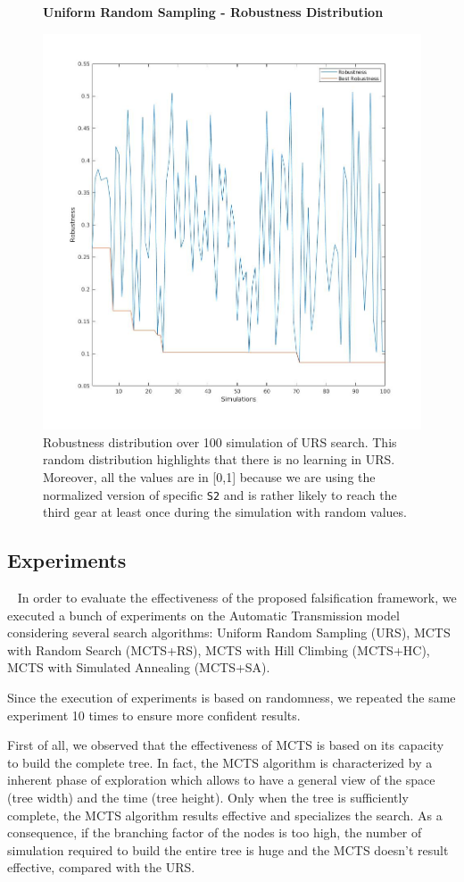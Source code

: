 \documentclass[11pt]{article}
\begin{document}
\begin{figure}[h]
    \centering
    \textbf{Uniform Random Sampling - Robustness Distribution}\par
    \includegraphics[width=0.5\linewidth]{img/urs_rob_distr.jpg}
    \caption{Robustness distribution over 100 simulation of URS search. This random distribution highlights that there is no learning in URS. Moreover, all the values are in [0,1] because we are using the normalized version of specific \texttt{S2} and is rather likely to reach the third gear at least once during the simulation with random values.}
\end{figure}

\pagebreak

\subsection{Experiments}~\label{sec:exp:exps}
In order to evaluate the effectiveness of the proposed falsification framework, we executed a bunch of experiments on the Automatic Transmission model considering several search algorithms: Uniform Random Sampling (URS), MCTS with Random Search (MCTS+RS), MCTS with Hill Climbing (MCTS+HC), MCTS with Simulated Annealing (MCTS+SA).

Since the execution of experiments is based on randomness, we repeated the same experiment 10 times to ensure more confident results.

First of all, we observed that the effectiveness of MCTS is based on its capacity to build the complete tree. In fact, the MCTS algorithm is characterized by a inherent phase of exploration which allows to have a general view of the space (tree width) and the time (tree height). Only when the tree is sufficiently complete, the MCTS algorithm results effective and specializes the search.
As a consequence, if the branching factor of the nodes is too high, the number of simulation required to build the entire tree is huge and the MCTS doesn't result effective, compared with the URS. 
\end{document}
